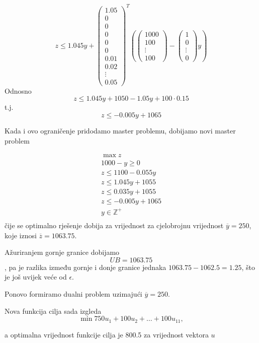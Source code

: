\documentclass[a4paper, utf8, 11pt, colorlinks]{book}
\begin{document}
 
 $$z\leqslant 1.045y+\left(\begin{array}{c}
 	1.05\\
 0\\
 0\\
 0\\
 0\\
 0\\
 0.01 \\
 0.02 \\
 \vdots \\
 0.05
 \end{array}\right)^T
 \left(\left(\begin{array}{c}
 	1000 \\
 	100 \\
 	\vdots \\
 	100
 \end{array}\right)-\left(\begin{array}{c}
 	1 \\
 	0 \\
 	\vdots \\
 	0
 \end{array}\right)y\right)$$
 Odnosno 
 $$z\leqslant 1.045y+1050-1.05y+100\cdot0.15$$
 t.j.
 $$z\leqslant -0.005y+1065$$
 
 
 Kada i ovo ograničenje pridodamo master problemu, dobijamo novi master problem
 
 $$
 \begin{aligned}
 	\max z\\
 	1000-y\geqslant 0\\
 	z\leqslant 1100-0.055y\\ 
 	z\leqslant 1.045y+1055\\
 	z\leqslant 0.035y+1055\\
 	z\leqslant -0.005y+1065\\
 	y\in\mathbb{Z}^+\\	
 \end{aligned}
 $$
 čije se optimalno rješenje dobija za vrijednost za cjelobrojnu vrijednost $\overline{y}=250$, koje iznosi $\overline{z} = 1063.75$.
 
 Ažuriranjem gornje granice dobijamo 
 $$UB = 1063.75$$, pa je razlika između gornje i donje granice jednaka
 $1063.75-1062.5=1.25$, što je još uvijek veće od $\epsilon$.
 
Ponovo formiramo dualni problem uzimajući $\overline{y}=250$.
 
 Nova funkcija cilja sada izgleda
 $$\min 750u_1+ 100u_2+\ldots+100u_{11},$$
 
 a optimalna vrijednost funkcije cilja je 800.5 za vrijednost vektora $u$
 
\end{document}
